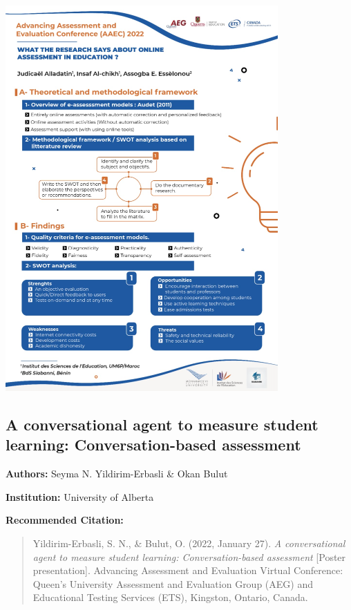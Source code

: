 \documentclass[
]{book}
\begin{document}
\includegraphics{Content/JA.png}

\newpage

\hypertarget{a-conversational-agent-to-measure-student-learning-conversation-based-assessment}{%
\subsection{A conversational agent to measure student learning: Conversation-based assessment}\label{a-conversational-agent-to-measure-student-learning-conversation-based-assessment}}

\textbf{Authors:} Seyma N. Yildirim-Erbasli \& Okan Bulut

\textbf{Institution:} University of Alberta

\textbf{Recommended Citation:}

\begin{quote}
Yildirim-Erbasli, S. N., \& Bulut, O. (2022, January 27). \emph{A conversational agent to measure student learning: Conversation-based assessment} {[}Poster presentation{]}. Advancing Assessment and Evaluation Virtual Conference: Queen's University Assessment and Evaluation Group (AEG) and Educational Testing Services (ETS), Kingston, Ontario, Canada.
\end{quote}
\end{document}
